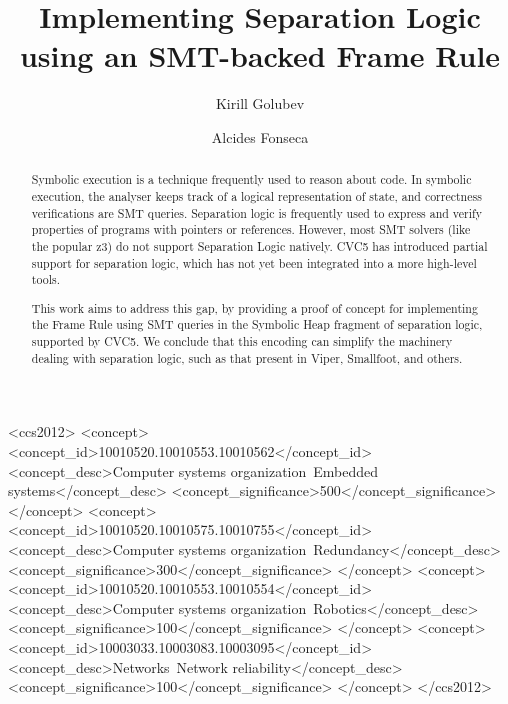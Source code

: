 \documentclass[sigplan,screen,review]{acmart}
\begin{document}
\title{Implementing Separation Logic using an SMT-backed Frame Rule}

\author{Kirill Golubev}
\author{Alcides Fonseca}

\begin{abstract}

Symbolic execution is a technique frequently used to reason about code. In symbolic execution, the analyser keeps track of a logical representation of state, and correctness verifications are SMT queries. Separation logic is frequently used to express and verify properties of programs with pointers or references. However, most SMT solvers (like the popular z3) do not support Separation Logic natively. CVC5 has introduced partial support for separation logic, which has not yet been integrated into a more high-level tools.

This work aims to address this gap, by providing a proof of concept for implementing the Frame Rule using SMT queries in the Symbolic Heap fragment of separation logic, supported by CVC5. We conclude that this encoding can simplify the machinery dealing with separation logic, such as that present in Viper, Smallfoot, and others.

\end{abstract}

\begin{CCSXML}
<ccs2012>
 <concept>
  <concept_id>10010520.10010553.10010562</concept_id>
  <concept_desc>Computer systems organization~Embedded systems</concept_desc>
  <concept_significance>500</concept_significance>
 </concept>
 <concept>
  <concept_id>10010520.10010575.10010755</concept_id>
  <concept_desc>Computer systems organization~Redundancy</concept_desc>
  <concept_significance>300</concept_significance>
 </concept>
 <concept>
  <concept_id>10010520.10010553.10010554</concept_id>
  <concept_desc>Computer systems organization~Robotics</concept_desc>
  <concept_significance>100</concept_significance>
 </concept>
 <concept>
  <concept_id>10003033.10003083.10003095</concept_id>
  <concept_desc>Networks~Network reliability</concept_desc>
  <concept_significance>100</concept_significance>
 </concept>
</ccs2012>
\end{CCSXML}
\end{document}
